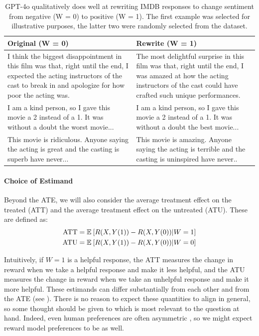 \documentclass{article}
\begin{document}
\begin{table}[t]
  \centering
  \small
  \renewcommand{\arraystretch}{1.5}
  \begin{tabular}{|p{6cm}|p{6cm}|}
  \hline
  \textbf{Original (W = 0)} & \textbf{Rewrite (W = 1)} \\
  \hline
  I think the biggest disappointment in this film was that, right until the end, I expected the acting instructors of the cast to break in and apologize for how poor the acting was. & The most delightful surprise in this film was that, right until the end, I was amazed at how the acting instructors of the cast could have crafted such unique performances. \\
  \hline
  I am a kind person, so I
  gave this movie a 2 instead of a 1. It was without a doubt the worst
  movie... & I am a kind person, so
  I gave this movie a 2
  instead of a 1. It was
  without a doubt the best
  movie... \\
  \hline
  This movie is ridiculous.
  Anyone saying the acting is great and the casting is superb have never... & This movie is amazing. Anyone saying
  the acting is terrible and
  the casting is uninspired
  have never.. \\
  \hline
  \end{tabular}
  \caption{GPT-4o qualitatively does well at rewriting IMDB responses to change sentiment from negative (W = 0) to positive (W = 1). The first example was selected for illustrative purposes, the latter two were randomly selected from the dataset.}
  \label{tab:rewrites}
\end{table}

\paragraph{Choice of Estimand}
Beyond the ATE, we will also consider the average treatment effect on the treated (ATT) and the average treatment effect on the untreated (ATU). These are defined as:
\begin{align*}
  \text{ATT} &= \mathbb{E}_{}\left[R(X, Y(1)) - R(X, Y(0))|W=1\right] \\
  \text{ATU} &= \mathbb{E}_{}\left[R(X, Y(1)) - R(X, Y(0))|W=0\right]
\end{align*}

Intuitively, if $W=1$ is a helpful response, the ATT measures the change in reward when we take a helpful response and make it less helpful, and the ATU measures the change in reward when we take an unhelpful response and make it more helpful.
These estimands can differ substantially from each other and from the ATE (see ).
There is no reason to expect these quantities to align in general, so some thought should be given to which is most relevant to the question at hand. Indeed, even human preferences are often asymmetric \citep{kahneman2013prospect}, so we might expect reward model preferences to be as well.
\end{document}
